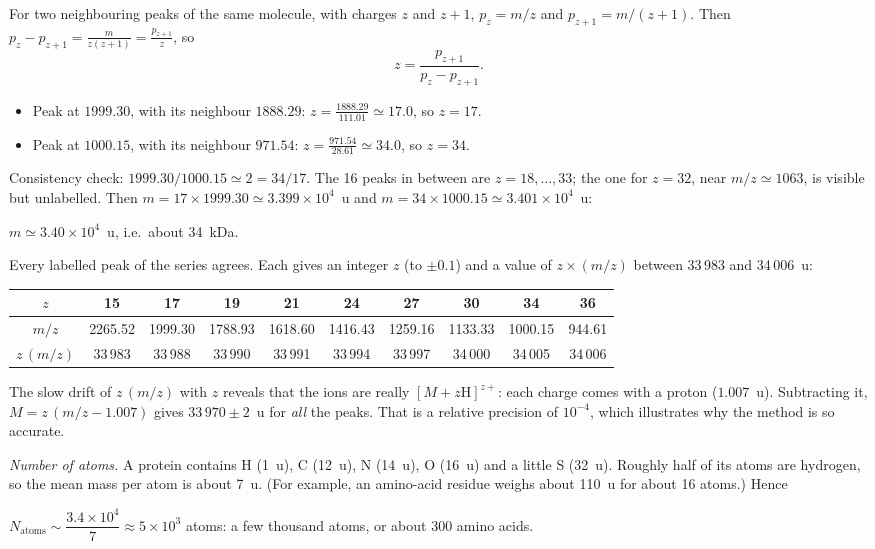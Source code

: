 \documentclass[11pt,a4paper]{article}
\begin{document}
For two neighbouring peaks of the same molecule, with charges $z$ and $z+1$,
$p_z = m/z$ and $p_{z+1} = m/(z+1)$. Then $p_z - p_{z+1} = \frac{m}{z(z+1)} = \frac{p_{z+1}}{z}$, so
\[
  z = \frac{p_{z+1}}{p_z - p_{z+1}} .
\]
\begin{itemize}
\item Peak at $1999.30$, with its neighbour $1888.29$: $z = \frac{1888.29}{111.01}\simeq17.0$,
  so $z = 17$.
\item Peak at $1000.15$, with its neighbour $971.54$: $z = \frac{971.54}{28.61}\simeq34.0$, so
  $z = 34$.
\end{itemize}
Consistency check: $1999.30/1000.15\simeq2 = 34/17$. The 16 peaks in between are
$z = 18,\dots,33$; the one for $z = 32$, near $m/z\simeq1063$, is visible but unlabelled.
Then $m = 17\times1999.30\simeq3.399\times10^4$~u and $m = 34\times1000.15\simeq3.401\times10^4$~u:
\begin{result}
$m\simeq3.40\times10^4$~u, i.e.\ about 34~kDa.
\end{result}
Every labelled peak of the series agrees. Each gives an integer $z$ (to $\pm0.1$) and a value
of $z\times(m/z)$ between 33\,983 and 34\,006~u:
\begin{center}\small
\begin{tabular}{c|ccccccccc}
$z$ & 15 & 17 & 19 & 21 & 24 & 27 & 30 & 34 & 36\\ \hline
$m/z$ & 2265.52 & 1999.30 & 1788.93 & 1618.60 & 1416.43 & 1259.16 & 1133.33 & 1000.15 & 944.61\\
$z\,(m/z)$ & 33\,983 & 33\,988 & 33\,990 & 33\,991 & 33\,994 & 33\,997 & 34\,000 & 34\,005 & 34\,006
\end{tabular}
\end{center}
\begin{remark}
The slow drift of $z\,(m/z)$ with $z$ reveals that the ions are really $[M+z\mathrm H]^{z+}$:
each charge comes with a proton ($1.007$~u). Subtracting it,
$M = z\,(m/z - 1.007)$ gives $33\,970\pm2$~u for \emph{all} the peaks. That is a relative
precision of $10^{-4}$, which illustrates why the method is so accurate.
\end{remark}

\emph{Number of atoms.} A protein contains H (1~u), C (12~u), N (14~u), O (16~u) and a little
S (32~u). Roughly half of its atoms are hydrogen, so the mean mass per atom is about 7~u. (For
example, an amino-acid residue weighs about 110~u for about 16 atoms.) Hence
\begin{result}
$N_{\text{atoms}}\sim\dfrac{3.4\times10^4}{7}\approx5\times10^3$ atoms: a few thousand atoms,
or about 300 amino acids.
\end{result}
\end{document}
